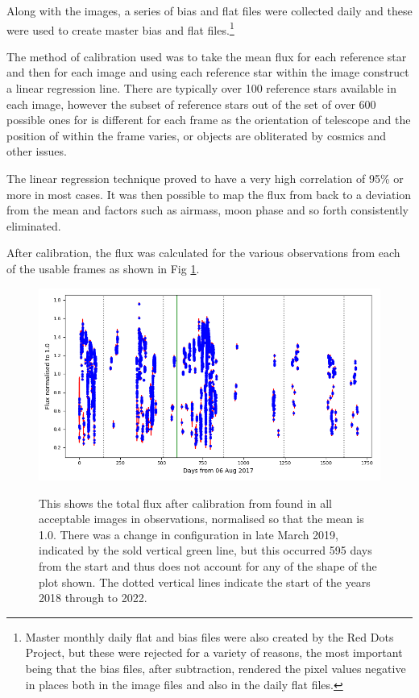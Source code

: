 Along with the images, a series of bias and flat files were collected daily and
these were used to create master bias and flat files.\footnote{Master monthly
daily flat and bias files were also created by the Red Dots Project, but these
were rejected for a variety of reasons, the most important being that the bias
files, after subtraction, rendered the pixel values negative in places both in
the image files and also in the daily flat files.}

The method of calibration used was to take the mean flux for each reference
star and then for each image and using each reference star within the image
construct a linear regression line. There are typically over 100 reference
stars available in each image, however the subset of reference stars out of the
set of over 600 possible ones for {\ross} is different for each frame as the
orientation of telescope and the position of {\ross} within the frame varies, or
objects are obliterated by cosmics and other issues.

The linear regression technique proved to have a very high correlation of
95\% or more in most cases. It was then possible to map the flux from {\ross}
back to a deviation from the mean and factors such as airmass, moon phase and so
forth consistently eliminated.

After calibration, the flux was calculated for the various observations from each
of the usable frames as shown in Fig \ref{fig:rossallcurve}.

\begin{figure}[!htbp]
\begin{center}
\includegraphics[scale=0.40]{REM/images/remrossallcurve.png} \\
\vspace{-.5cm}
\end{center}   
\caption{This shows the total flux after calibration from {\ross}
found in all acceptable images in {\rem}
observations, normalised so that the mean is 1.0. There was a change in
configuration in late March 2019, indicated by the sold vertical green line, but
this occurred 595 days from the start and thus does
not account for any of the shape of the plot
shown. The dotted vertical lines indicate the
start of the years 2018 through to 2022.}\protect\label{fig:rossallcurve}
\end{figure}

